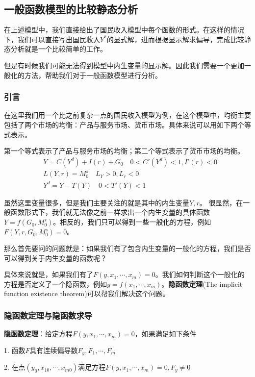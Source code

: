 \documentclass[UTF8,12pt]{ctexart}
\numberwithin{equation}{section} %
\numberwithin{figure}{section}
\numberwithin{table}{section}
\begin{document}
	\subsection{一般函数模型的比较静态分析}
	在上述模型中，我们直接给出了国民收入模型中每个函数的形式。在这样的情况下，我们可以直接写出国民收入$Y^*$的显式解，进而根据显示解求偏导，完成比较静态分析就是一个比较简单的工作。
	
	但是有时候我们可能无法得到模型中内生变量的显示解。因此我们需要一个更加一般化的方法，帮助我们对于一般函数模型进行分析。
	
	\subsubsection{引言}
	在这里我们用一个比之前复杂一点的国民收入模型为例，在这个模型中，均衡主要包括了两个市场的均衡：产品与服务市场、货币市场。具体来说可以用如下两个等式表示。
	
	第一个等式表示了产品与服务市场的均衡；第二个等式表示了货币市场的均衡。
	\begin{equation}
		\begin{aligned}
			&Y = C(Y^d) + I(r) + G_0 \quad 0<C'(Y^d)<1,I'(r) < 0\\
			&L(Y,r) = M_0^s \quad L_Y>0,L_r < 0 \\
			&Y^d = Y-T(Y) \quad 0< T'(Y) < 1
		\end{aligned}
	\end{equation}
	
	虽然这里变量很多，但是我们主要关注的就是其中的内生变量$Y,r$。
	很显然，在一般函数形式下，我们就无法像之前一样求出一个内生变量的具体函数$Y = f(G_0,M^s_0)$。相反的，我们只可以得到一些一般化的方程，例如$F(Y,r,G_0,M^s_0) = 0$。
	
	那么首先要问的问题就是：如果我们有了包含内生变量的一般化的方程，我们是否可以得到关于内生变量的函数呢？
	
	具体来说就是，如果我们有了$F(y,x_1,\cdots,x_m) = 0$。我们如何判断这个一般化的方程是否定义了一个隐函数，例如$y = f(x_1,\cdots,x_m)$。\textbf{隐函数定理}(The implicit function existence theorem)可以帮我们解决这个问题。
	
	\subsubsection{隐函数定理与隐函数求导}
	\textbf{隐函数定理}：给定方程$F(y,x_1,\cdots,x_m) = 0$，如果满足如下条件
	
	1. 函数$F$具有连续偏导数$F_y,F_1,\cdots,F_m$
	
	2. 在点$(y_0,x_{10},\cdots,x_{m0})$满足方程$F(y,x_1,\cdots,x_m) = 0,F_y \neq 0$
	
\end{document}
